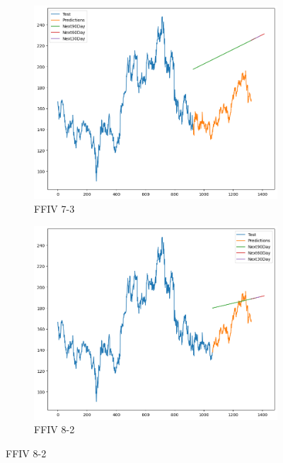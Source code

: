 \documentclass{ieeeojies}
\begin{document}
\begin{figure}[h]
    \centering
    \begin{subfigure}[h]{0.33\linewidth}
        \centering
        \includegraphics[width=\linewidth]{Linear Plot/FFIV_Linear Regression_7_3.png}
        \caption{FFIV 7-3}
        \label{fig:ffiv-7-3}
    \end{subfigure}%
    \hfill
    \begin{subfigure}[h]{0.33\linewidth}
        \centering
        \includegraphics[width=\linewidth]{Linear Plot/FFIV_Linear Regression_8_2.png}
        \caption{FFIV 8-2}
        \label{fig:ffiv-8-2}
    \end{subfigure}%

\end{figure}
\end{document}
